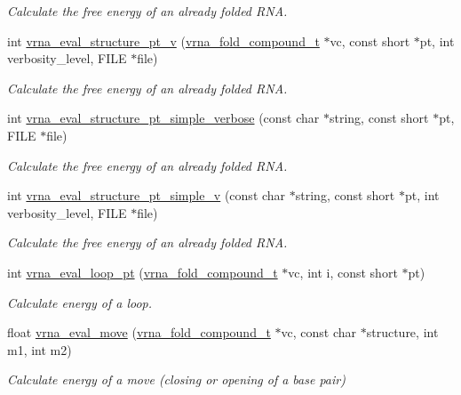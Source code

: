 \begin{DoxyCompactItemize}
\begin{DoxyCompactList}\small\item\em Calculate the free energy of an already folded R\+NA. \end{DoxyCompactList}\item 
int \hyperlink{group__eval_ga2c6533ba0afe4c88d335d8f1e0e2a48e}{vrna\+\_\+eval\+\_\+structure\+\_\+pt\+\_\+v} (\hyperlink{group__fold__compound_ga1b0cef17fd40466cef5968eaeeff6166}{vrna\+\_\+fold\+\_\+compound\+\_\+t} $\ast$vc, const short $\ast$pt, int verbosity\+\_\+level, F\+I\+LE $\ast$file)
\begin{DoxyCompactList}\small\item\em Calculate the free energy of an already folded R\+NA. \end{DoxyCompactList}\item 
int \hyperlink{group__eval_ga76e152ee9a02be23da14cdddf52b4e44}{vrna\+\_\+eval\+\_\+structure\+\_\+pt\+\_\+simple\+\_\+verbose} (const char $\ast$string, const short $\ast$pt, F\+I\+LE $\ast$file)
\begin{DoxyCompactList}\small\item\em Calculate the free energy of an already folded R\+NA. \end{DoxyCompactList}\item 
int \hyperlink{group__eval_gac40b813d35289da9816d0c1eec94faa5}{vrna\+\_\+eval\+\_\+structure\+\_\+pt\+\_\+simple\+\_\+v} (const char $\ast$string, const short $\ast$pt, int verbosity\+\_\+level, F\+I\+LE $\ast$file)
\begin{DoxyCompactList}\small\item\em Calculate the free energy of an already folded R\+NA. \end{DoxyCompactList}\item 
int \hyperlink{group__eval_ga730ba4df55c02fd530a0cddd49faf760}{vrna\+\_\+eval\+\_\+loop\+\_\+pt} (\hyperlink{group__fold__compound_ga1b0cef17fd40466cef5968eaeeff6166}{vrna\+\_\+fold\+\_\+compound\+\_\+t} $\ast$vc, int i, const short $\ast$pt)
\begin{DoxyCompactList}\small\item\em Calculate energy of a loop. \end{DoxyCompactList}\item 
float \hyperlink{group__eval_gaff1b9e4f4d17b434b0a822fe783672c1}{vrna\+\_\+eval\+\_\+move} (\hyperlink{group__fold__compound_ga1b0cef17fd40466cef5968eaeeff6166}{vrna\+\_\+fold\+\_\+compound\+\_\+t} $\ast$vc, const char $\ast$structure, int m1, int m2)
\begin{DoxyCompactList}\small\item\em Calculate energy of a move (closing or opening of a base pair) \end{DoxyCompactList}\item 

\end{DoxyCompactItemize}
